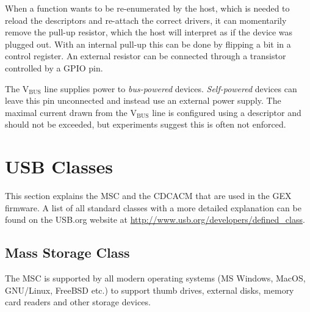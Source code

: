 When a function wants to be re-enumerated by the host, which is needed to reload the descriptors and re-attach the correct drivers, it can momentarily remove the pull-up resistor, which the host will interpret as if the device was plugged out. With an internal pull-up this can be done by flipping a bit in a control register. An external resistor can be connected through a transistor controlled by a \gls{GPIO} pin.


The V$_\mathrm{BUS}$ line supplies power to \textit{bus-powered} devices. \textit{Self-powered} devices can leave this pin unconnected and instead use an external power supply. The maximal current drawn from the V$_\mathrm{BUS}$ line is configured using a descriptor and should not be exceeded, but experiments suggest this is often not enforced.

\section{USB Classes}

This section explains the \gls{MSC} and the \gls{CDCACM} that are used in the GEX firmware. A list of all standard classes with a more detailed explanation can be found on the USB.org website at \url{http://www.usb.org/developers/defined\_class}.

\subsection{Mass Storage Class}

The \gls{MSC} is supported by all modern operating systems (MS Windows, MacOS, GNU/Linux, FreeBSD etc.) to support thumb drives, external disks, memory card readers and other storage devices.


